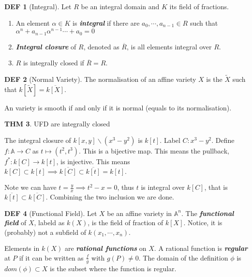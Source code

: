 \documentclass[twocolumn]{article}
\renewcommand{\emph}[1]{\textbf{\textit{#1}}}
\newcommand{\A}{\mathbb{A}}
\theoremstyle{definition}
\newtheorem{thm}{THM}
\newtheorem{defi}[thm]{DEF}
\theoremstyle{remark}
\begin{document}
\begin{defi}[Integral]
	Let $R$ be an integral domain and $K$ its field of fractions.
	\begin{enumerate}
		\item An element $\alpha \in K$ is \emph{integral} if there are $a_0, \cdots, a_{n-1} \in R$ such that $\alpha^n + a_{n-1}\alpha^{n-1} \cdots + a_0 = 0$
		\item \emph{Integral closure} of $R$, denoted as $\overline{R}$, is all elements integral over $R$.
		\item $R$ is integrally closed if $\overline{R} = R$.
	\end{enumerate}
\end{defi}

\begin{defi}[Normal Variety]
	The normalisation of an affine variety $X$ is the $\tilde{X}$ such that $k[\tilde{X}] = \overline{k[X]}$.

	An variety is smooth if and only if it is normal (equals to its normalisation).
\end{defi}

\begin{thm}UFD are integrally closed \end{thm}

\begin{eg}{}{}
	The integral closure of $k[x,y] \backslash (x^3 - y^2)$ is $k[t]$.
	\tcblower
	Label $C: x^3 - y^2$. 
	Define $f: \A \rightarrow C$ as $t \mapsto (t^2, t^3)$. This is a bijective map. This means the pullback, $f^*: k[C] \rightarrow k[t]$, is injective. 
	This means $k[C] \subset k[t] \implies \overline{k[C]} \subset \overline{k[t]} = k[t]$.

	Note we can have $t = \frac{y}{x} \implies t^2 - x = 0$, thus $t$ is integral over $k[C]$, that is $\overline{k[t]} \subset \overline{k[C]}$.
	Combining the two inclusion we are done.
\end{eg}

\begin{defi}[Functional Field]
	Let $X$ be an affine variety in $\A^n$. The \emph{functional field} of $X$, labeld as $k(X)$, is the field of fraction of $k[X]$. 
	Notice, it is (probably) not a subfield of $k(x_1, \cdots, x_n)$.

	Elements in $k(X)$ are \emph{rational functions} on $X$.
	A rational function is \emph{regular} at $P$ if it can be written as $\frac{f}{g}$ with $g(P) \neq 0$.
	The domain of the definition $\phi$ is $dom(\phi) \subset X$ is the subset where the function is regular.
\end{defi}
\end{document}
